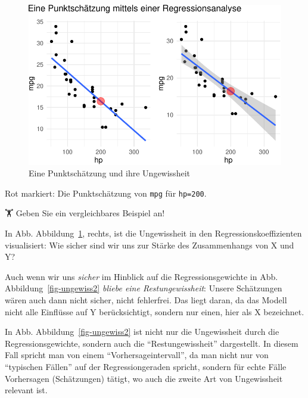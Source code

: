 \documentclass[
  a4paper,
  DIV=11]{scrreprt}
\theoremstyle{definition}
\theoremstyle{remark}
\begin{document}
\begin{figure}

{\centering \includegraphics{./Inferenz_files/figure-pdf/fig-punktschaetzer-1.pdf}

}

\caption{\label{fig-punktschaetzer}Eine Punktschätzung und ihre
Ungewissheit}

\end{figure}

Rot markiert: Die Punktschätzung von \texttt{mpg} für \texttt{hp=200}.

🏋 Geben Sie ein vergleichbares Beispiel an!

In Abb. Abbildung~\ref{fig-punktschaetzer}, rechts, ist die Ungewissheit
in den Regressionskoeffizienten visualisiert: Wie sicher sind wir uns
zur Stärke des Zusammenhangs von X und Y?

Auch wenn wir uns \emph{sicher} im Hinblick auf die Regressionsgewichte
in Abb. Abbildung~\ref{fig-ungewiss2} \emph{bliebe eine
Restungewissheit}: Unsere Schätzungen wären auch dann nicht sicher,
nicht fehlerfrei. Das liegt daran, da das Modell nicht alle Einflüsse
auf Y berücksichtigt, sondern nur einen, hier als X bezeichnet.

In Abb. Abbildung~\ref{fig-ungewiss2} ist nicht nur die Ungewissheit
durch die Regressionsgewichte, sondern auch die ``Restungewissheit''
dargestellt. In diesem Fall spricht man von einem
``Vorhersageintervall'', da man nicht nur von ``typischen Fällen'' auf
der Regressiongeraden spricht, sondern für echte Fälle Vorhersagen
(Schätzungen) tätigt, wo auch die zweite Art von Ungewissheit relevant
ist.
\end{document}
